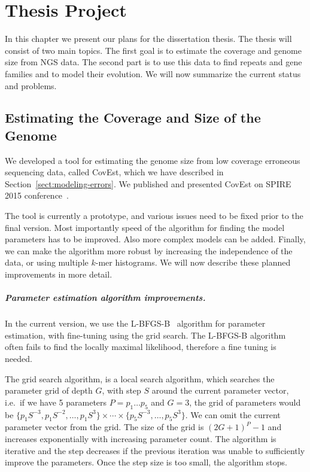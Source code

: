 \chapter{Thesis Project}

In this chapter we present our plans for the dissertation thesis.
The thesis will consist of two main topics.
The first goal is to estimate the coverage and genome size from NGS data. The second part is to use this data to find repeats and gene families and to model their evolution.
We will now summarize the current status and problems.

\section{Estimating the Coverage and Size of the Genome}

We developed a tool for estimating the genome size from low coverage erroneous sequencing data, called CovEst, which we have described in Section~\ref{sect:modeling-errors}. We published and presented CovEst on SPIRE 2015 conference~\cite{covest}.

The tool is currently a prototype, and various issues need to be fixed prior to the final version.
Most importantly speed of the algorithm for finding the model parameters has to be improved. Also more complex models can be added. Finally, we can make the algorithm more robust by increasing the independence of the data, or using multiple $k$-mer histograms.
We will now describe these planned improvements in more detail.

\paragraph{Parameter estimation algorithm improvements.}
In the current version, we use the L-BFGS-B~\cite{l-bfgs-b} algorithm for parameter estimation, with fine-tuning using the grid search.
The L-BFGS-B algorithm often fails to find the locally maximal likelihood, therefore a fine tuning is needed.

The grid search algorithm, is a local search algorithm, which searches the parameter grid of depth $G$, with step $S$ around the current parameter vector, i.e.\ if we have 5 parameters $P = p_1\dots p_5$ and $G = 3$, the grid of parameters would be $\{p_1 S^{-3}, p_1 S^{-2}, \dots, p_1 S^3\} \times \cdots \times \{p_5 S^{-3}, \dots, p_5 S^3\}$. We can omit the current parameter vector from the grid. The size of the grid is ${(2G + 1)}^P - 1$ and increases exponentially with increasing parameter count. The algorithm is iterative and the step decreases if the previous iteration was unable to sufficiently improve the parameters. Once the step size is too small, the algorithm stops.


